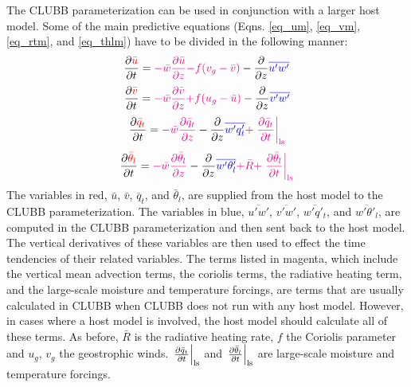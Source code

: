 \documentclass[11pt,fleqn]{article}
\newcommand{\ptlder}[2]{\frac{\partial #1}{\partial #2}}
\begin{document}
The CLUBB parameterization can be used in conjunction with a larger host model.
Some of the main predictive equations (Eqns. \ref{eq_um}, \ref{eq_vm},
\ref{eq_rtm}, and \ref{eq_thlm}) have to be divided in the following manner:
%
\begin{equation}
\ptlder{\color{red}\bar{u}}{t} 
= {\color{magenta}- \bar{w}\ptlder{\bar{u}}{z}}
  {\color{magenta}- f (v_g - \bar{v})}
  - \ptlder{}{z}{\color{blue}\overline{u'w'}}
\end{equation}
%
\begin{equation}
\ptlder{\color{red}\bar{v}}{t} 
= {\color{magenta}- \bar{w}\ptlder{\bar{v}}{z}}
  {\color{magenta}+ f (u_g - \bar{u})}
  - \ptlder{}{z}{\color{blue}\overline{v'w'}}
\end{equation}
%
\begin{equation}
\ptlder{\color{red}\bar{q}_t}{t}
= {\color{magenta}- \bar{w}\ptlder{\bar{q}_t}{z}}
  - \ptlder{}{z}{\color{blue}\overline{w'q'_t}}
  {\color{magenta}+ \left. \ptlder{\bar{q}_t}{t} \right|_{\rm ls}}
\end{equation}
%
\begin{equation}
\ptlder{\color{red}\bar{\theta}_l}{t} 
= {\color{magenta}- \bar{w}\ptlder{\bar{\theta}_l}{z}}
  - \ptlder{}{z}{\color{blue}\overline{w'\theta'_l}}
  {\color{magenta}+ \bar{R}}
  {\color{magenta}+ \left. \ptlder{\bar{\theta}_l}{t} \right|_{\rm ls}}
\end{equation}
%
{\color{red}The variables in red, $\bar{u}$, $\bar{v}$, $\bar{q}_t$, and
$\bar{\theta}_l$, are supplied from the host model to the CLUBB parameterization.}
{\color{blue}The variables in blue, $\overline{u'w'}$, $\overline{v'w'}$,
$\overline{w'q'_t}$, and $\overline{w'\theta'_l}$, are computed in the CLUBB
parameterization and then sent back to the host model.  The vertical
derivatives of these variables are then used to effect the time tendencies of
their related variables.}  {\color{magenta}The terms listed in magenta, which
include the vertical mean advection terms, the coriolis terms, the radiative 
heating term, and the large-scale moisture and temperature forcings, are terms 
that are usually calculated in CLUBB when CLUBB does not run with any host model.
However, in cases where a host model is involved, the host model should
calculate all of these terms.}  As before, $\bar{R}$ is the radiative heating 
rate, $f$ the Coriolis parameter and $u_g$, $v_g$ the geostrophic winds.
$\left. \ptlder{\bar{q}_t}{t} \right|_{\rm ls}$ and 
$\left. \ptlder{\bar{\theta}_l}{t} \right|_{\rm ls}$ are
large-scale moisture and temperature forcings.
\end{document}

